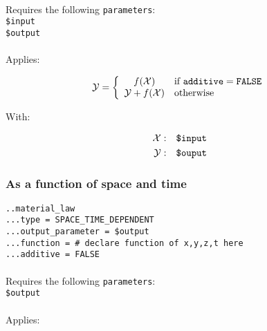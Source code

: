 \documentclass[10pt]{article}
\begin{document}
\paragraph{}Requires the following \verb+parameters+:\\

\noindent \verb+$input+\\
\verb+$output+

\paragraph{}Applies:

\begin{equation}
	\mathcal{Y} = \left\{ \begin{array}{cl} f(\mathcal{X}) & \text{if }\verb+additive+ = \verb+FALSE+  \\ \mathcal{Y}+f(\mathcal{X}) & \text{otherwise} \end{array} \right.
\end{equation}

With:

\begin{eqnarray}
	\mathcal{X} & : & \verb+$input+ \notag \\
	\mathcal{Y} & : & \verb+$ouput+\notag  
\end{eqnarray}

\subsubsection{As a function of space and time}

\noindent \verb+..material_law+\\
\verb+...type = SPACE_TIME_DEPENDENT+\\
\verb+...output_parameter = $output+\\
\verb+...function = # declare function of x,y,z,t here+\\
\verb+...additive = FALSE+

\paragraph{}Requires the following \verb+parameters+:\\

\noindent \verb+$output+

\paragraph{}Applies:
\end{document}
